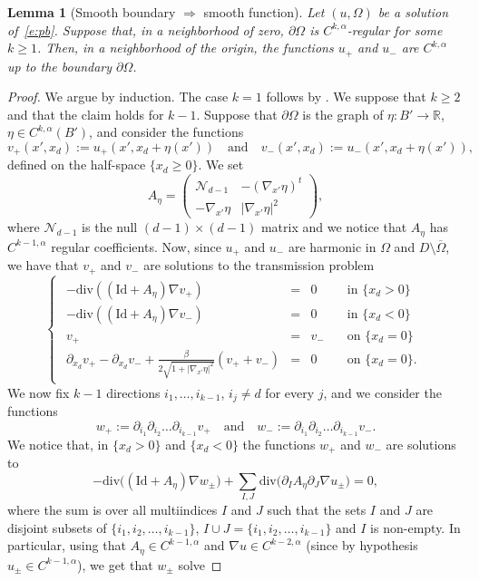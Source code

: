 \documentclass[11pt]{article}
\numberwithin{equation}{section}
\newcommand{\Id}{\mathrm{Id}}
\theoremstyle{plain}
\newtheorem{lemma}[teo]{Lemma}
\theoremstyle{definition}
\let\ds\displaystyle
\def\R{\mathbb{R}}
\begin{document}
\begin{lemma}[Smooth boundary $\Rightarrow$ smooth function]\label{l:reg1}
Let $(u,\Omega)$ be a solution of~\eqref{e:pb}. Suppose that, in a neighborhood of zero, $\partial\Omega$ is $C^{k,\alpha}$-regular for some $k\ge 1$. Then, in a neighborhood of the origin, the functions $u_+$ and $u_-$ are $C^{k,\alpha}$ up to the boundary $\partial\Omega$.
\end{lemma}
\begin{proof}
We argue by induction. The case $k=1$ follows by \cite{D}. We suppose that $k\ge 2$ and that the claim holds for $k-1$.
Suppose that $\partial\Omega$ is the graph of $\eta:B'\to\R$, $\eta\in C^{k,\alpha}(B')$, and consider the functions
\[v_+(x',x_d):=u_+(x',x_d+\eta(x'))\quad\text{and}\quad v_-(x',x_d):=u_-(x',x_d+\eta(x')),\]
defined on the half-space $\{x_d\ge 0\}$.
We set
\[A_\eta=\begin{pmatrix}
\mathcal N_{d-1} & -(\nabla_{\!x'}\eta)^t\\
-\nabla_{\!x'}\eta & |\nabla_{\!x'}\eta|^2
\end{pmatrix},\]
where $\mathcal N_{d-1} $ is the null $(d-1)\times (d-1)$ matrix and we notice that $A_\eta$ has $C^{k-1,\alpha}$ regular coefficients.
Now, since $u_+$ and $u_-$ are harmonic in $\Omega$ and $D\setminus\overline\Omega$, we have that $v_+$ and $v_-$ are solutions to the transmission problem
\[\begin{cases}
\begin{array}{rcll}
-\text{div}((\Id+A_\eta)\nabla v_+)&=&0&\quad\text{in }\{x_d>0\}\\
-\text{div}((\Id+A_\eta)\nabla v_-)&=&0&\quad\text{in }\{x_d<0\}\\
v_+&=&v_-&\quad\text{on }\{x_d=0\}\\
\ds\partial_{x_d}v_+-\partial_{x_d}v_-+\frac{\beta}{2\sqrt{1+|\nabla_{\!x'}\eta|^2}}(v_++v_-)&=&0&\quad\text{on }\{x_d=0\}.
\end{array}
\end{cases}\]
We now fix $k-1$ directions $i_1,\dots,i_{k-1}$, $i_j\neq d$ for every $j$, and we consider the functions
\[w_+:=\partial_{i_1}\partial_{i_2}\dots\partial_{i_{k-1}}v_+\quad\text{and}\quad w_-:=\partial_{i_1}\partial_{i_2}\dots\partial_{i_{k-1}}v_-.\]
We notice that, in $\{x_d>0\}$ and $\{x_{d}<0\}$ the functions $w_+$ and $w_-$ are solutions to
\[
\ds-\text{div}\big((\Id+A_\eta)\nabla w_\pm\big)+\sum_{I,J}\text{div}\big(\partial_IA_\eta\partial_J\nabla u_\pm\big)=0,\]
where the sum is over all multiindices $I$ and $J$ such that the sets $I$ and $J$ are disjoint subsets of $\{i_1,i_2,\dots,i_{k-1}\}$, $I\cup J=\{i_1,i_2,\dots,i_{k-1}\}$ and $I$ is non-empty. In particular, using that $A_\eta\in C^{k-1,\alpha}$ and $\nabla u\in C^{k-2,\alpha}$ (since by hypothesis $u_\pm\in C^{k-1,\alpha}$), we get that $w_\pm$ solve

\end{proof}
\end{document}
